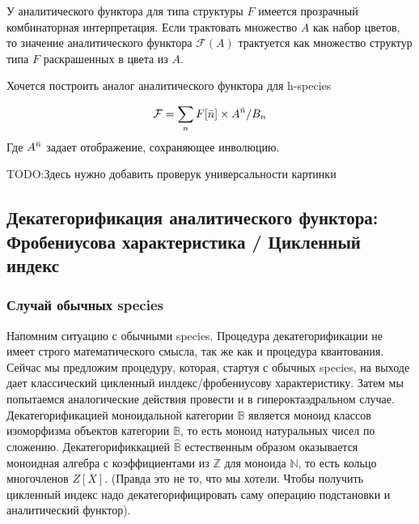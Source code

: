 У аналитического функтора для типа структуры $F$ имеется прозрачный комбинаторная интерпретация.
Если трактовать множество $A$ как набор цветов,
то значение аналитического функтора $\mathcal F(A)$ трактуется как множество структур типа $F$
раскрашенных в цвета из $A$.

Хочется построить аналог аналитического функтора для h-species


\begin{equation}
\label{eq:h-an}
	\mathcal F = \sum\limits_n F[\Bar n] \times A^{\Bar n} / B_n
\end{equation}
Где $A^{\Bar n}$ задает отображение, сохраняющее инволюцию. 

TODO:Здесь нужно добавить проверук универсальности картинки

\subsection{Декатегорификация аналитического функтора: Фробениусова
характеристика / Цикленный индекс} 
\subsubsection{Случай обычных species}
Напомним ситуацию с обычными species.
Процедура декатегорификации не имеет строго математического смысла, так же как и процедура квантования.
Сейчас мы предложим процедуру, которая, стартуя с обычных species,
на выходе дает классический цикленный инлдекс/фробениусову характеристику.
Затем мы попытаемся аналогические действия провести и в гипероктаэдральном случае.
Декатегорификацией моноидальной категории $\mathbb B$ является моноид классов изоморфизма объектов категории
$\mathbb B$, то есть моноид натуральных чисел по сложению.
Декатегорификкацией $\widehat{\mathbb B}$ естественным образом оказывается
моноидная алгебра с коэффициентами из $\mathbb Z$ для моноида $\mathbb N$, то есть кольцо многочленов $Z[X]$.
(Правда это не то, что мы хотели. Чтобы получить цикленный индекс надо декатегорифицировать
саму операцию подстановки и аналитический функтор).

